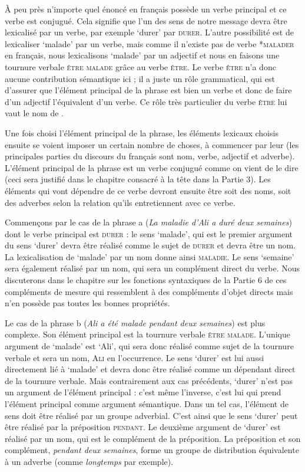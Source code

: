 À peu près n’importe quel énoncé en français possède un verbe principal et ce verbe est conjugué. Cela signifie que l’un des sens de notre message devra être lexicalisé par un verbe, par exemple ‘durer’ par \textsc{durer}. L’autre possibilité est de lexicaliser ‘malade’ par un verbe, mais comme il n’existe pas de verbe *\textsc{malader} en français, nous lexicalisons ‘malade’ par un adjectif et nous en faisons une tournure verbale \textsc{être} \textsc{malade} grâce au verbe \textsc{être}. Le verbe \textsc{être} n’a donc aucune contribution sémantique ici ; il a juste un rôle grammatical, qui est d’assurer que l’élément principal de la phrase est bien un verbe et donc de faire d’un adjectif l’équivalent d’un verbe. Ce rôle très particulier du verbe \textsc{être} lui vaut le nom de .

Une fois choisi l’élément principal de la phrase, les éléments lexicaux choisis ensuite se voient imposer un certain nombre de choses, à commencer par leur  (les principales parties du discours du français sont nom, verbe, adjectif et adverbe). L’élément principal de la phrase est un verbe conjugué comme on vient de le dire (ceci sera justifié dans le chapitre consacré à la tête dans la Partie 3). Les éléments qui vont dépendre de ce verbe devront ensuite être soit des noms, soit des adverbes selon la relation qu’ils entretiennent avec ce verbe.

Commençons par le cas de la phrase a (\textit{La maladie d’Ali a duré deux semaines}) dont le verbe principal est \textsc{durer} \textsc{:} le sens ‘malade’, qui est le premier argument du sens ‘durer’ devra être réalisé comme le sujet de \textsc{durer} et devra être un nom. La lexicalisation de ‘malade’ par un nom donne ainsi \textsc{maladie}. Le sens ‘semaine’ sera également réalisé par un nom, qui sera un complément direct du verbe. Nous discuterons dans le chapitre sur les fonctions syntaxiques de la Partie 6 de ces compléments de mesure qui ressemblent à des compléments d’objet directs mais n’en possède pas toutes les bonnes propriétés.

Le cas de la phrase b (\textit{Ali a été malade pendant deux semaines}) est plus complexe. Son élément principal est la tournure verbale \textsc{être} \textsc{malade}. L’unique argument de ‘malade’ est ‘Ali’, qui sera donc réalisé comme sujet de la tournure verbale et sera un nom, \textsc{Ali} en l’occurrence. Le sens ‘durer’ est lui aussi directement lié à ‘malade’ et devra donc être réalisé comme un dépendant direct de la tournure verbale. Mais contrairement aux cas précédents, ‘durer’ n’est pas un argument de l’élément principal : c’est même l’inverse, c’est lui qui prend l’élément principal comme argument sémantique. Dans un tel cas, l’élément de sens doit être réalisé par un groupe adverbial. C’est ainsi que le sens ‘durer’ peut être réalisé par la préposition \textsc{pendant}. Le deuxième argument de ‘durer’ est réalisé par un nom, qui est le complément de la préposition. La préposition et son complément, \textit{pendant deux semaines}, forme un groupe de distribution équivalente à un adverbe (comme \textit{longtemps} par exemple).

